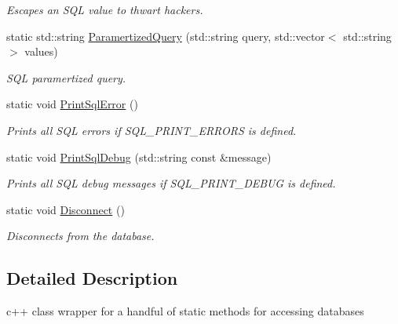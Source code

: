 \begin{DoxyCompactItemize}
\begin{DoxyCompactList}\small\item\em Escapes an S\-Q\-L value to thwart hackers. \end{DoxyCompactList}\item 
static std\-::string \hyperlink{classDb_1_1Db_acab38065a09648c66c53c1f948c48b6a}{Paramertized\-Query} (std\-::string query, std\-::vector$<$ std\-::string $>$ values)
\begin{DoxyCompactList}\small\item\em S\-Q\-L paramertized query. \end{DoxyCompactList}\item 
\hypertarget{classDb_1_1Db_a46c8f600cae71bddda3419a600e99136}{static void \hyperlink{classDb_1_1Db_a46c8f600cae71bddda3419a600e99136}{Print\-Sql\-Error} ()}\label{classDb_1_1Db_a46c8f600cae71bddda3419a600e99136}

\begin{DoxyCompactList}\small\item\em Prints all S\-Q\-L errors if S\-Q\-L\-\_\-\-P\-R\-I\-N\-T\-\_\-\-E\-R\-R\-O\-R\-S is defined. \end{DoxyCompactList}\item 
\hypertarget{classDb_1_1Db_ab0701e0bc17f6f01b0cbaaab05be3a6e}{static void \hyperlink{classDb_1_1Db_ab0701e0bc17f6f01b0cbaaab05be3a6e}{Print\-Sql\-Debug} (std\-::string const \&message)}\label{classDb_1_1Db_ab0701e0bc17f6f01b0cbaaab05be3a6e}

\begin{DoxyCompactList}\small\item\em Prints all S\-Q\-L debug messages if S\-Q\-L\-\_\-\-P\-R\-I\-N\-T\-\_\-\-D\-E\-B\-U\-G is defined. \end{DoxyCompactList}\item 
\hypertarget{classDb_1_1Db_a0f8b285970a00da958843ff27e05447b}{static void \hyperlink{classDb_1_1Db_a0f8b285970a00da958843ff27e05447b}{Disconnect} ()}\label{classDb_1_1Db_a0f8b285970a00da958843ff27e05447b}

\begin{DoxyCompactList}\small\item\em Disconnects from the database. \end{DoxyCompactList}\end{DoxyCompactItemize}


\subsection{Detailed Description}
c++ class wrapper for a handful of static methods for accessing databases 

